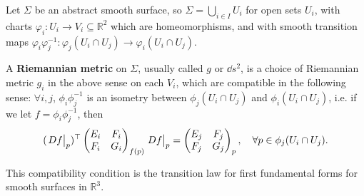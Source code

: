 \documentclass[a4paper]{article}
\begin{document}
\begin{definition}
	Let \( \Sigma \) be an abstract smooth surface, so \( \Sigma = \bigcup_{i \in I} U_i \) for open sets \( U_i \), with charts \( \varphi_i \colon U_i \to V_i \subseteq \mathbb R^2 \) which are homeomorphisms, and with smooth transition maps \( \varphi_i \varphi_j^{-1} \colon \varphi_j(U_i \cap U_j) \to \varphi_i(U_i \cap U_j) \).

	A \textbf{Riemannian metric} on \( \Sigma \), usually called \( g \) or \( \dd{s}^2 \), is a choice of Riemannian metric $g_i$ in the above sense on each \( V_i \), which are compatible in the following sense: $ \forall i,j $, $ \phi_i\phi_j^{-1} $ is an isometry between $ \phi_j(U_i\cap U_j) $ and $ \phi_i (U_i\cap U_j) $, i.e. if we let $ f = \phi_i \phi_j^{-1} $, then 
	\[
		(\teval{Df}{p})^\top \begin{pmatrix}
			E_i  &  F_i \\
			F_i &  G_i \\
		\end{pmatrix}_{f(p)} \teval{Df }{p} = \begin{pmatrix}
			E_j &  F_j \\
			F_j &  G_j \\
		\end{pmatrix}_p,\quad \forall p\in \phi_j(U_i\cap U_j). 
	\]
\end{definition}
This compatibility condition is the transition law for first fundamental forms for smooth surfaces in \( \mathbb R^3 \).
\end{document}
